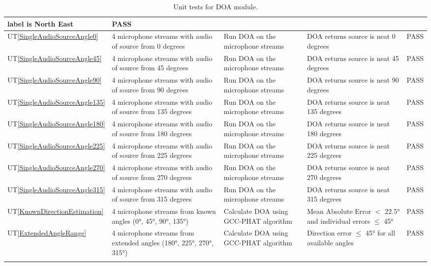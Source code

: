 \documentclass[12pt, titlepage]{article}
\newcommand{\utref}[1]{UT\ref{#1}}
\begin{document}
{\begin{longtable}{|p{0.8cm}|p{3.5cm}|p{3.5cm}|p{3.5cm}|p{1cm}|}
    label is North East & PASS\\ \hline
    \utref{SingleAudioSourceAngle0} & 4 microphone streams with audio of source
    from 0 degrees & Run DOA on the microphone streams  & DOA returns source is
    neat 0 degrees & PASS\\ \hline
    \utref{SingleAudioSourceAngle45} & 4 microphone streams with audio of source
    from 45 degrees & Run DOA on the microphone streams  & DOA returns source is
    neat 45 degrees & PASS\\ \hline
    \utref{SingleAudioSourceAngle90} & 4 microphone streams with audio of source
    from 90 degrees & Run DOA on the microphone streams  & DOA returns source is
    neat 90 degrees & PASS\\ \hline
    \utref{SingleAudioSourceAngle135} & 4 microphone streams with audio of
    source from 135 degrees & Run DOA on the microphone streams  & DOA returns
    source is neat 135 degrees & PASS\\ \hline
    \utref{SingleAudioSourceAngle180} & 4 microphone streams with audio of
    source from 180 degrees & Run DOA on the microphone streams  & DOA returns
    source is neat 180 degrees & PASS\\ \hline
    \utref{SingleAudioSourceAngle225} & 4 microphone streams with audio of
    source from 225 degrees & Run DOA on the microphone streams  & DOA returns
    source is neat 225 degrees & PASS\\ \hline
    \utref{SingleAudioSourceAngle270} & 4 microphone streams with audio of
    source from 270 degrees & Run DOA on the microphone streams  & DOA returns
    source is neat 270 degrees & PASS\\ \hline
    \utref{SingleAudioSourceAngle315} & 4 microphone streams with audio of
    source from 315 degrees & Run DOA on the microphone streams  & DOA returns
    source is neat 315 degrees & PASS\\ \hline
    \utref{KnownDirectionEstimation} & 4 microphone streams from known angles
    (0°, 45°, 90°, 135°) & Calculate DOA using GCC-PHAT algorithm  & Mean
    Absolute Error $<$ 22.5° and individual errors $\leq$ 45° & PASS\\ \hline
    \utref{ExtendedAngleRange} & 4 microphone streams from extended angles
    (180°, 225°, 270°, 315°) & Calculate DOA using GCC-PHAT algorithm  &
    Direction error $\leq$ 45° for all available angles & PASS\\ \hline
    \caption{Unit tests for DOA module.}
    \label{tab:unit_test_doa}
\end{longtable}
}
\end{document}
